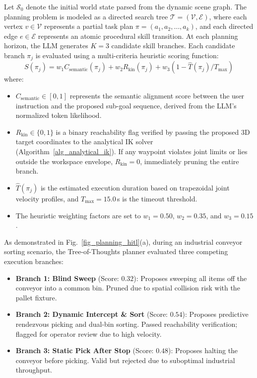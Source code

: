 \documentclass[journal]{IEEEtran}
\begin{document}
Let $\mathcal{S}_0$ denote the initial world state parsed from the dynamic scene graph. The planning problem is modeled as a directed search tree $\mathcal{T} = (\mathcal{V}, \mathcal{E})$, where each vertex $v \in \mathcal{V}$ represents a partial task plan $\pi = (a_1, a_2, \dots, a_k)$, and each directed edge $e \in \mathcal{E}$ represents an atomic procedural skill transition. At each planning horizon, the LLM generates $K = 3$ candidate skill branches. Each candidate branch $\pi_j$ is evaluated using a multi-criteria heuristic scoring function:
\begin{equation}
S(\pi_j) = w_1 C_{\text{semantic}}(\pi_j) + w_2 R_{\text{kin}}(\pi_j) + w_3 (1 - \hat{T}(\pi_j)/T_{\text{max}})
\end{equation}
where:
\begin{itemize}
    \item $C_{\text{semantic}} \in [0, 1]$ represents the semantic alignment score between the user instruction and the proposed sub-goal sequence, derived from the LLM's normalized token likelihood.
    \item $R_{\text{kin}} \in \{0, 1\}$ is a binary reachability flag verified by passing the proposed 3D target coordinates to the analytical IK solver (Algorithm~\ref{alg_analytical_ik}). If any waypoint violates joint limits or lies outside the workspace envelope, $R_{\text{kin}} = 0$, immediately pruning the entire branch.
    \item $\hat{T}(\pi_j)$ is the estimated execution duration based on trapezoidal joint velocity profiles, and $T_{\text{max}} = 15.0$\,s is the timeout threshold.
    \item The heuristic weighting factors are set to $w_1 = 0.50$, $w_2 = 0.35$, and $w_3 = 0.15$.
\end{itemize}

As demonstrated in Fig.~\ref{fig_planning_hitl}(a), during an industrial conveyor sorting scenario, the Tree-of-Thoughts planner evaluated three competing execution branches:
\begin{itemize}
    \item \textbf{Branch 1: Blind Sweep} (Score: $0.32$): Proposes sweeping all items off the conveyor into a common bin. Pruned due to spatial collision risk with the pallet fixture.
    \item \textbf{Branch 2: Dynamic Intercept \& Sort} (Score: $0.54$): Proposes predictive rendezvous picking and dual-bin sorting. Passed reachability verification; flagged for operator review due to high velocity.
    \item \textbf{Branch 3: Static Pick After Stop} (Score: $0.48$): Proposes halting the conveyor before picking. Valid but rejected due to suboptimal industrial throughput.
\end{itemize}
\end{document}
